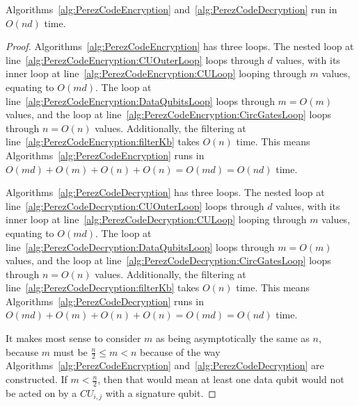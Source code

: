 \begin{theorem}
Algorithms~\ref{alg:PerezCodeEncryption} and~\ref{alg:PerezCodeDecryption} run in $O\left(nd \right)$ time. 
\end{theorem}
\begin{proof}
Algorithms~\ref{alg:PerezCodeEncryption} has three loops. The nested loop at line~\ref{alg:PerezCodeEncryption:CUOuterLoop} loops through $d$ values, with its inner loop at line~\ref{alg:PerezCodeEncryption:CULoop} looping through $m$ values, equating to $O\left(md\right)$. The loop at line~\ref{alg:PerezCodeEncryption:DataQubitsLoop} loops through $m = O\left(m\right)$ values, and the loop at line~\ref{alg:PerezCodeEncryption:CircGatesLoop} loops through $n = O\left(n\right)$ values. Additionally, the filtering at line~\ref{alg:PerezCodeEncryption:filterKb} takes $O\left(n\right)$ time. This means Algorithms~\ref{alg:PerezCodeEncryption} runs in  $O\left(md\right) + O\left(m\right) + O\left(n\right) + O\left(n\right) = O\left(md\right) = O\left(nd\right)$ time.

Algorithms~\ref{alg:PerezCodeDecryption} has three loops. The nested loop at line~\ref{alg:PerezCodeDecryption:CUOuterLoop} loops through $d$ values, with its inner loop at line~\ref{alg:PerezCodeDecryption:CULoop} looping through $m$ values, equating to $O\left(md\right)$. The loop at line~\ref{alg:PerezCodeDecryption:DataQubitsLoop} loops through $m = O\left(m\right)$ values, and the loop at line~\ref{alg:PerezCodeDecryption:CircGatesLoop} loops through $n = O\left(n\right)$ values. Additionally, the filtering at line~\ref{alg:PerezCodeDecryption:filterKb} takes $O\left(n\right)$ time. This means Algorithms~\ref{alg:PerezCodeDecryption} runs in  $O\left(md\right) + O\left(m\right) + O\left(n\right) + O\left(n\right) = O\left(md\right) = O\left(nd\right)$ time.

It makes most sense to consider $m$ as being asymptotically the same as $n$, because $m$ must be $\frac{n}{2} \leq m < n$ because of the way Algorithms~\ref{alg:PerezCodeEncryption} and~\ref{alg:PerezCodeDecryption} are constructed. If $m < \frac{n}{2}$, then that would mean at least one data qubit would not be acted on by a $\mathit{CU}_{i,j}$ with a signature qubit. 
\end{proof}


